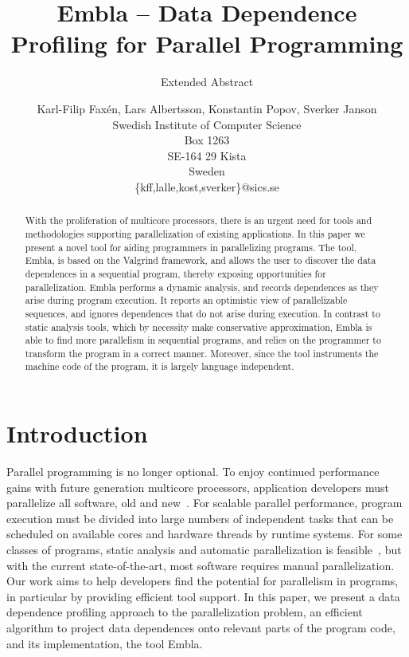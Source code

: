 \documentclass{acm_proc_article-sp}
\begin{document}
\title{Embla -- Data Dependence Profiling for Parallel Programming }
\subtitle{Extended Abstract}
\author{Karl-Filip Fax\'en, Lars Albertsson, Konstantin Popov, Sverker Janson\\
       Swedish Institute of Computer Science\\
       Box 1263\\
       SE-164 29 Kista\\
       Sweden\\
       \{kff,lalle,kost,sverker\}@sics.se}
\date{}
\maketitle

\begin{abstract}

With the proliferation of multicore processors, there is an urgent need for
tools and methodologies supporting parallelization of existing
applications.  In this paper we present a novel tool for aiding
programmers in parallelizing programs. The tool, Embla, is based on the
Valgrind framework, and allows the user to
discover the data dependences in a sequential program, thereby exposing
opportunities for parallelization.  Embla performs a dynamic analysis,
and records dependences as they
arise during program execution.  It reports an optimistic view of
parallelizable sequences, and ignores dependences that do not arise during
execution.  In contrast to static analysis tools,
which by necessity make conservative approximation, Embla is able to find
more parallelism in sequential programs, and relies on the programmer to
transform the program in a correct manner. 
Moreover, since the tool instruments the machine code of the program,
it is largely language independent. 

\end{abstract}


\section{Introduction}

Parallel programming is no longer optional.  To enjoy continued
performance gains with future generation multicore processors,
application developers must parallelize all software, old and
new~\cite{TEL95,ONHWC96,KAB03,VIAVAC05}.  For scalable parallel
performance, program execution must be divided into large numbers of
independent tasks that can be scheduled on available cores and hardware
threads by runtime systems.  For some classes of programs, static
analysis and automatic parallelization is feasible~\cite{KA02}, but with
the current state-of-the-art, most software requires manual
parallelization.  Our work aims to help developers find the potential
for parallelism in programs, in particular by providing efficient tool
support.  In this paper, we present a data dependence profiling approach
to the parallelization problem, an efficient algorithm to project data
dependences onto relevant parts of the program code, and its
implementation, the tool Embla.
\end{document}
